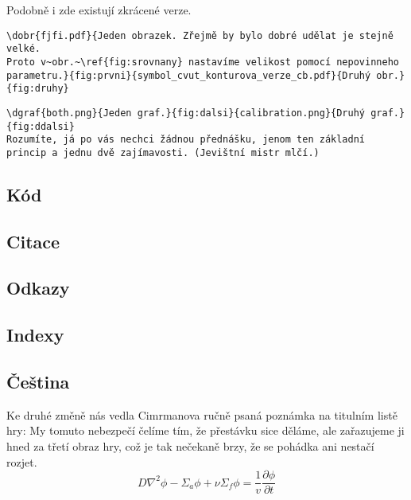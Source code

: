 \documentclass{cygclanek}
\begin{document}
Podobně i zde existují zkrácené verze.
\begin{verbatim}
\dobr{fjfi.pdf}{Jeden obrazek. Zřejmě by bylo dobré udělat je stejně velké.
Proto v~obr.~\ref{fig:srovnany} nastavíme velikost pomocí nepovinneho
parametru.}{fig:prvni}{symbol_cvut_konturova_verze_cb.pdf}{Druhý obr.}{fig:druhy}
\end{verbatim}

\begin{verbatim}
\dgraf{both.png}{Jeden graf.}{fig:dalsi}{calibration.png}{Druhý graf.}{fig:ddalsi}
Rozumíte, já po vás nechci žádnou přednášku, jenom ten základní princip a jednu dvě zajímavosti. (Jevištní mistr mlčí.)
\end{verbatim}


\subsection{Kód}

\subsection{Citace}

\subsection{Odkazy}

\subsection{Indexy}

\subsection{Čeština}











Ke druhé změně \cite{trace_parcs} nás vedla Cimrmanova ručně psaná poznámka na titulním listě hry:
 My tomuto nebezpečí čelíme tím, že
přestávku sice děláme, ale zařazujeme ji hned za třetí obraz hry, což je tak
nečekaně brzy, že se pohádka ani nestačí rozjet. 
\begin{equation}
  D\nabla^2\phi - \Sigma_a\phi + \nu\Sigma_f\phi = \frac{1}{v}\frac{\partial
  \phi}{\partial t}
  \label{difuzka}
\end{equation}
\end{document}
